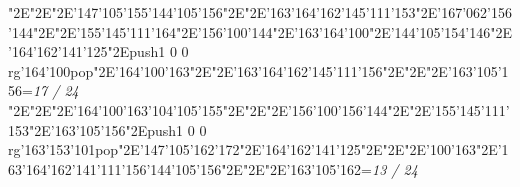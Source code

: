 \null\vfill\enskip\enskip\enskip\ipa\char"2E\enskip\enskip\enskip\ipa\char"2E\enskip\ipa\char"2E\ipa\char'147\ipa\char'105\ipa\char'155\bigskip\ipa\char'144\ipa\char'105\ipa\char'156\ipa\char"2E\enskip\enskip\enskip\ipa\char"2E\ipa\char'163\ipa\char'164\ipa\char'162\ipa\char'145\ipa\char'111\ipa\char'153\bigskip\enskip\enskip\ipa\char"2E\ipa\char'167\ipa\char'062\ipa\char'156\ipa\char'144\ipa\char"2E\enskip\ipa\char"2E\ipa\char'155\ipa\char'145\ipa\char'111\ipa\char'164\ipa\char"2E\ipa\char'156\ipa\char'100\ipa\char'144\ipa\char"2E\ipa\char'163\ipa\char'164\ipa\char'100\ipa\char"2E\ipa\char'144\ipa\char'105\ipa\char'154\ipa\char'146\bigskip\enskip\ipa\char"2E\ipa\char'164\ipa\char'162\ipa\char'141\ipa\char'125\ipa\char"2E\pdfcolorstack\match push{1 0 0 rg}\ipa\char'164\ipa\char'100\pdfcolorstack\match pop{}\ipa\char"2E\ipa\char'164\ipa\char'100\ipa\char'163\ipa\char"2E\enskip\enskip\ipa\char"2E\ipa\char'163\ipa\char'164\ipa\char'162\ipa\char'145\ipa\char'111\ipa\char'156\bigskip\enskip\enskip\enskip\ipa\char"2E\enskip\enskip\ipa\char"2E\enskip\enskip\enskip\ipa\char"2E\ipa\char'163\ipa\char'105\ipa\char'156\bigskip\vfill\footline={\hfill\tenrm\it 17 / 24}\eject
\null\vfill\enskip\enskip\enskip\ipa\char"2E\enskip\enskip\enskip\ipa\char"2E\enskip\ipa\char"2E\ipa\char'164\ipa\char'100\ipa\char'163\bigskip\ipa\char'104\ipa\char'105\ipa\char'155\ipa\char"2E\enskip\enskip\enskip\ipa\char"2E\enskip\enskip\enskip\enskip\enskip\enskip\bigskip\enskip\enskip\ipa\char"2E\ipa\char'156\ipa\char'100\ipa\char'156\ipa\char'144\ipa\char"2E\enskip\ipa\char"2E\ipa\char'155\ipa\char'145\ipa\char'111\ipa\char'153\ipa\char"2E\ipa\char'163\ipa\char'105\ipa\char'156\ipa\char"2E\pdfcolorstack\match push{1 0 0 rg}\ipa\char'163\ipa\char'153\ipa\char'101\pdfcolorstack\match pop{}\ipa\char"2E\ipa\char'147\ipa\char'105\ipa\char'162\ipa\char'172\bigskip\enskip\ipa\char"2E\ipa\char'164\ipa\char'162\ipa\char'141\ipa\char'125\ipa\char"2E\enskip\enskip\ipa\char"2E\enskip\enskip\enskip\ipa\char"2E\ipa\char'100\ipa\char'163\ipa\char"2E\ipa\char'163\ipa\char'164\ipa\char'162\ipa\char'141\ipa\char'111\ipa\char'156\bigskip\ipa\char'144\ipa\char'105\ipa\char'156\ipa\char"2E\enskip\enskip\ipa\char"2E\enskip\enskip\enskip\ipa\char"2E\ipa\char'163\ipa\char'105\ipa\char'162\bigskip\vfill\footline={\hfill\tenrm\it 13 / 24}\eject
